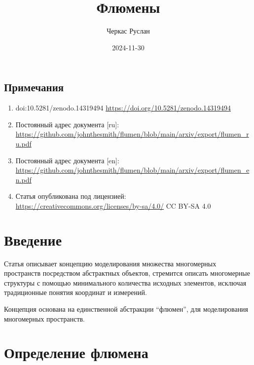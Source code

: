 \documentclass[final]{article}
\begin{document}
    \title{Флюмены}
    \author{Черкас Руслан}
    \date{2024-11-30}

    \begin{small}
        \begingroup
        \renewcommand{\baselinestretch}{0.8}

        \renewcommand{\contentsname}{Содержание}
        \maketitle
        \tableofcontents

        \section*{Примечания}
            \begin{enumerate}
                \item doi:10.5281/zenodo.14319494
                \url{https://doi.org/10.5281/zenodo.14319494}

                \item Постоянный адрес документа [ru]: 
                \url{https://github.com/johnthesmith/flumen/blob/main/arxiv/export/flumen_ru.pdf}

                \item Постоянный адрес документа [en]: 
                \url{https://github.com/johnthesmith/flumen/blob/main/arxiv/export/flumen_en.pdf}

                \item Статья опубликована под лицензией: 
                \url{https://creativecommons.org/licenses/by-sa/4.0/} CC BY-SA 4.0
            \end{enumerate}
        \endgroup
    \end{small}

    \section{Введение}

        Статья описывает концепцию моделирования множества многомерных 
        пространств посредством абстрактных объектов, стремится описать 
        многомерные структуры с помощью минимального количества исходных 
        элементов, исключая традиционные понятия координат и измерений.

        Концепция основана на единственной абстракции ``флюмен'', для 
        моделирования многомерных пространств.

    \section{Определение флюмена} 
\end{document}
